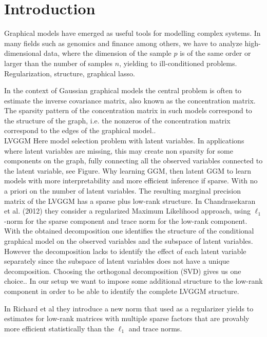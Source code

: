 \section{Introduction}
\label{intro}


Graphical models have emerged as useful tools for modelling complex systems. In many fields such as genomics and finance among others, we have to analyze high-dimensional data, where the dimension of the sample $p$ is of the same order or larger than the number of samples $n$, yielding to ill-conditioned problems. 
Regularization, structure, graphical lasso. 

In the context of Gaussian graphical models the central problem is often to estimate the inverse covariance matrix, also known as the concentration matrix. The sparsity pattern of the concentration matrix in such models correspond to the structure of the graph, i.e. the nonzeros of the concentration matrix correspond to the edges of the graphical model.. \\

LVGGM
Here model selection problem with latent variables. In applications where latent variables are missing, this may create non sparsity for some components on the graph, fully connecting all the observed variables connected to the latent variable, see Figure. 
Why learning GGM, then latent GGM to learn models with more interpretability and more efficient inference if sparse. With no a priori on the number of latent variables.
The resulting marginal precision matrix of the LVGGM has a sparse plus low-rank structure. In Chandrasekaran et al. (2012) they consider a regularized Maximum Likelihood approach, using $\ell_1$-norm for the sparse component and trace norm for the low-rank component. With the obtained decomposition one identifies the structure of the conditional graphical model on the observed variables and the subspace of latent variables. However the decomposition lacks to identify the effect of each latent variable separately since the subspace of latent variables does not have a unique decomposition. Choosing the orthogonal decomposition (SVD) gives us one choice.. In our setup we want to impose some additional structure to the low-rank component in order to be able to identify the complete LVGGM structure.  

In Richard et al they introduce a new norm that used as a regularizer yields to  estimates for low-rank matrices with multiple sparse factors that are provably more efficient statistically than the $\ell_1$ and trace norms.

